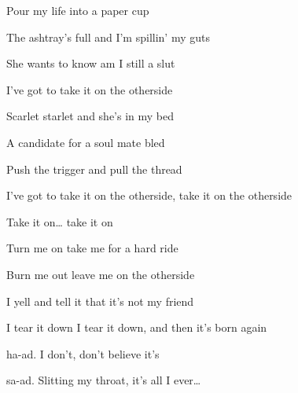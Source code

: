 \begin{song}
\bigskip

\Chorus

\bigskip

 Pour my life into a paper cup \par
{} The ashtray's full and I'm spillin' my guts \par
{} She wants to know am I still a slut \par
I've got to take it on the otherside 

\bigskip

 Scarlet starlet and she's in my bed \par
{} A candidate for a soul mate bled \par
{} Push the trigger and pull the thread \par
I've got to take it on the otherside, take it on the otherside \par
{}Take it on… take it on

\bigskip

\Chorus

\bigskip

   \par
{}   \par

\bigskip

 Turn me on take me for a hard ride \par
{} Burn me out leave me on the otherside \par
{} I yell and tell it that it's not my friend \par
I tear it down I tear it down, and then it's born again 

\bigskip

    \par

\bigskip

\Chorus

\bigskip

ha-ad. I don't, don't believe it's \par
{}sa-ad. Slitting my throat, it's all I ever…  \par

\end{song}
